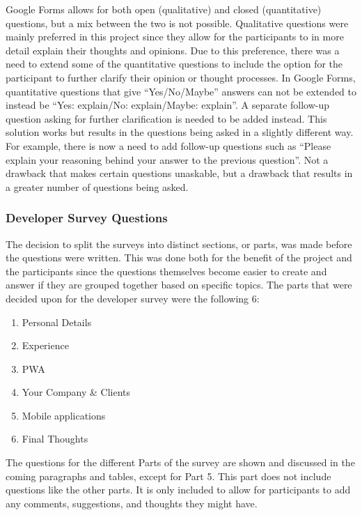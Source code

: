 \documentclass[a4paper,12pt]{article}
\begin{document}
Google Forms allows for both open (qualitative) and closed (quantitative) questions, but a mix between the two is not possible. Qualitative questions were mainly preferred in this project since they allow for the participants to in more detail explain their thoughts and opinions. Due to this preference, there was a need to extend some of the quantitative questions to include the option for the participant to further clarify their opinion or thought processes. In Google Forms, quantitative questions that give “Yes/No/Maybe” answers can not be extended to instead be “Yes: explain/No: explain/Maybe: explain”. A separate follow-up question asking for further clarification is needed to be added instead. This solution works but results in the questions being asked in a slightly different way. For example, there is now a need to add follow-up questions such as “Please explain your reasoning behind your answer to the previous question”. Not a drawback that makes certain questions unaskable, but a drawback that results in a greater number of questions being asked.

\subsubsection{Developer Survey Questions}
\label{Project_surveyDesign_devQuestions}
The decision to split the surveys into distinct sections, or parts, was made before the questions were written. This was done both for the benefit of the project and the participants since the questions themselves become easier to create and answer if they are grouped together based on specific topics. The parts that were decided upon for the developer survey were the following 6:

\begin{enumerate}
    \item Personal Details
    \item Experience
    \item PWA
    \item Your Company \& Clients
    \item Mobile applications
    \item Final Thoughts
\end{enumerate}

The questions for the different Parts of the survey are shown and discussed in the coming paragraphs and tables, except for Part 5. This part does not include questions like the other parts. It is only included to allow for participants to add any comments, suggestions, and thoughts they might have.
\end{document}
